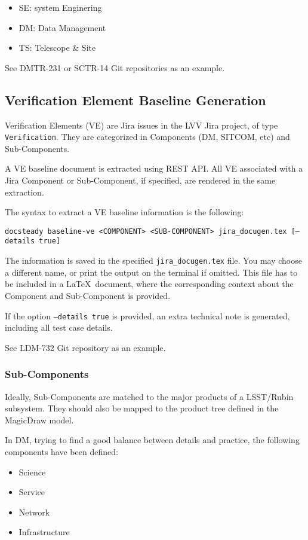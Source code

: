 \documentclass[DM]{lsstdoc}
\begin{document}
\begin{itemize}
\item SE: system Enginering
\item DM: Data Management
\item TS: Telescope \& Site
\end{itemize}

See DMTR-231 or SCTR-14 Git repositories as an example.



\subsection{Verification Element Baseline Generation}

Verification Elements (VE) are Jira issues in the LVV Jira project, of type \texttt{Verification}.
They are categorized in Components (DM, SITCOM, etc) and Sub-Components.

A VE baseline document is extracted using REST API.
All VE associated with a Jira Component or Sub-Component, if specified, are rendered in the same extraction.

The syntax to extract a VE baseline information is the following:

\texttt{docsteady baseline-ve <COMPONENT> <SUB-COMPONENT> jira\_docugen.tex [--details true]}

The information is saved in the specified \texttt{jira\_docugen.tex} file. You may choose a different name, or print the output on the terminal if omitted.
This file has to be included in a \LaTeX~document, where the corresponding context about the Component and Sub-Component is provided.

If the option \texttt{--details true} is provided, an extra technical note is generated, including all test case details.

See LDM-732 Git repository as an example.


\subsubsection{Sub-Components}

Ideally, Sub-Components are matched to the major products of a LSST/Rubin subsystem. 
They should also be mapped to the product tree defined in the MagicDraw model.

In DM, trying to find a good balance between details and practice, the following components have been defined:

\begin{itemize}
\item Science
\item Service
\item Network
\item Infrastructure
\end{itemize}
\end{document}
